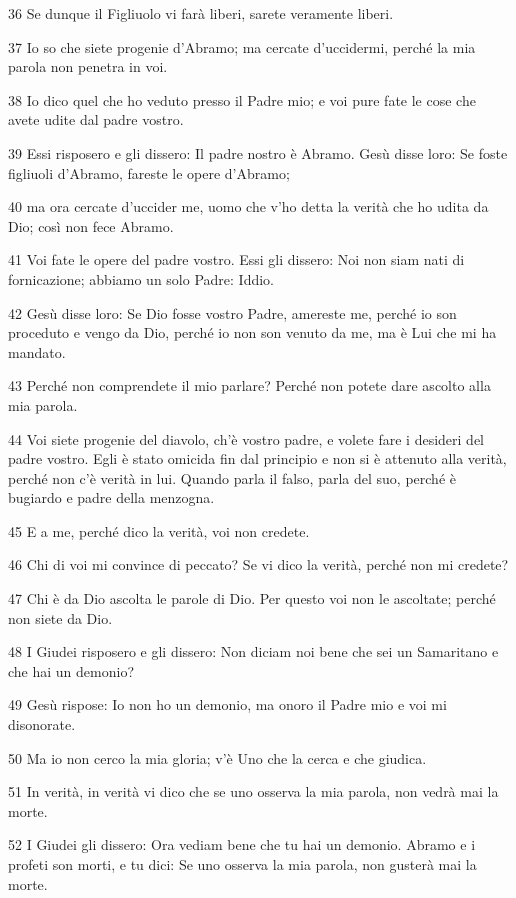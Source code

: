 \par 36 Se dunque il Figliuolo vi farà liberi, sarete veramente liberi.
\par 37 Io so che siete progenie d'Abramo; ma cercate d'uccidermi, perché la mia parola non penetra in voi.
\par 38 Io dico quel che ho veduto presso il Padre mio; e voi pure fate le cose che avete udite dal padre vostro.
\par 39 Essi risposero e gli dissero: Il padre nostro è Abramo. Gesù disse loro: Se foste figliuoli d'Abramo, fareste le opere d'Abramo;
\par 40 ma ora cercate d'uccider me, uomo che v'ho detta la verità che ho udita da Dio; così non fece Abramo.
\par 41 Voi fate le opere del padre vostro. Essi gli dissero: Noi non siam nati di fornicazione; abbiamo un solo Padre: Iddio.
\par 42 Gesù disse loro: Se Dio fosse vostro Padre, amereste me, perché io son proceduto e vengo da Dio, perché io non son venuto da me, ma è Lui che mi ha mandato.
\par 43 Perché non comprendete il mio parlare? Perché non potete dare ascolto alla mia parola.
\par 44 Voi siete progenie del diavolo, ch'è vostro padre, e volete fare i desideri del padre vostro. Egli è stato omicida fin dal principio e non si è attenuto alla verità, perché non c'è verità in lui. Quando parla il falso, parla del suo, perché è bugiardo e padre della menzogna.
\par 45 E a me, perché dico la verità, voi non credete.
\par 46 Chi di voi mi convince di peccato? Se vi dico la verità, perché non mi credete?
\par 47 Chi è da Dio ascolta le parole di Dio. Per questo voi non le ascoltate; perché non siete da Dio.
\par 48 I Giudei risposero e gli dissero: Non diciam noi bene che sei un Samaritano e che hai un demonio?
\par 49 Gesù rispose: Io non ho un demonio, ma onoro il Padre mio e voi mi disonorate.
\par 50 Ma io non cerco la mia gloria; v'è Uno che la cerca e che giudica.
\par 51 In verità, in verità vi dico che se uno osserva la mia parola, non vedrà mai la morte.
\par 52 I Giudei gli dissero: Ora vediam bene che tu hai un demonio. Abramo e i profeti son morti, e tu dici: Se uno osserva la mia parola, non gusterà mai la morte.
